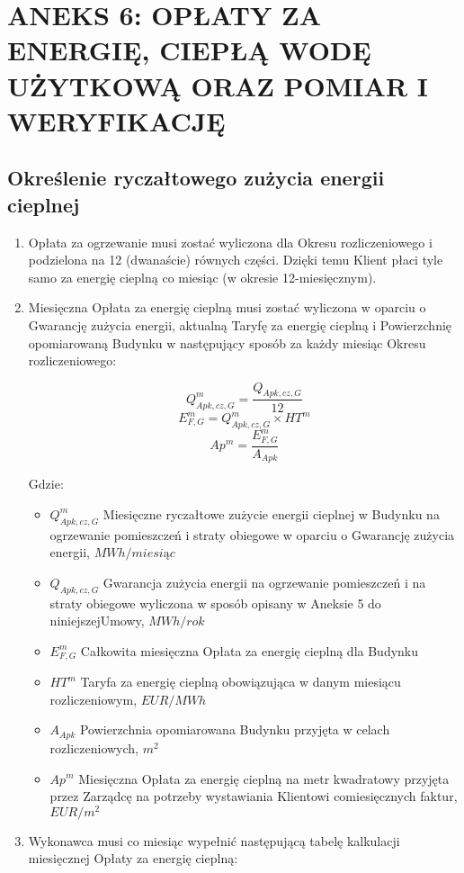 \section{ANEKS 6: OPŁATY ZA ENERGIĘ, CIEPŁĄ WODĘ UŻYTKOWĄ ORAZ POMIAR I WERYFIKACJĘ}

\subsection{Określenie ryczałtowego zużycia energii cieplnej}
\begin{enumerate}
	\item Opłata za ogrzewanie musi zostać wyliczona dla Okresu rozliczeniowego i podzielona na 12 (dwanaście) równych części. Dzięki temu Klient płaci tyle samo za energię cieplną co miesiąc (w okresie 12-miesięcznym).
	\item Miesięczna Opłata za energię cieplną musi zostać wyliczona w oparciu o Gwarancję zużycia energii, aktualną Taryfę za energię cieplną i Powierzchnię opomiarowaną Budynku w następujący sposób za każdy miesiąc Okresu rozliczeniowego:

\[ Q^{m}_{Apk,cz,G} = \frac{Q_{Apk,cz,G}}{12} \]
\[ E^{m}_{F,G} = Q^{m}_{Apk,cz,G} \times HT^m \]
\[ Ap^m = \frac{E^{m}_{F,G} }{A_{Apk}} \]

Gdzie:

\begin{itemize}
	\item $Q^{m}_{Apk,cz,G}$ Miesięczne ryczałtowe zużycie energii cieplnej w Budynku na ogrzewanie pomieszczeń i straty obiegowe w oparciu o Gwarancję zużycia energii, $MWh/miesiąc$
	\item $Q_{Apk,cz,G}$ Gwarancja zużycia energii na ogrzewanie pomieszczeń i na straty obiegowe wyliczona w sposób opisany w Aneksie 5 do niniejszejUmowy, $MWh/rok$
	\item $E^{m}_{F,G}$ Całkowita miesięczna Opłata za energię cieplną dla Budynku
	\item $HT^m$ Taryfa za energię cieplną obowiązująca w danym miesiącu rozliczeniowym, $EUR/MWh$
	\item $A_{Apk}$ Powierzchnia opomiarowana Budynku przyjęta w celach rozliczeniowych, $m^2$
	\item $Ap^m$ Miesięczna Opłata za energię cieplną na metr kwadratowy przyjęta przez Zarządcę na potrzeby wystawiania Klientowi comiesięcznych faktur, $EUR/m^2$
\end{itemize}

	\item Wykonawca musi co miesiąc wypełnić następującą tabelę kalkulacji miesięcznej Opłaty za energię cieplną:


\end{enumerate}

